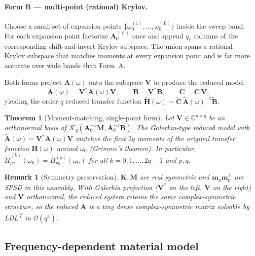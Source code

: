 \documentclass[11pt,a4paper]{article}
\newcommand{\C}{\mathbb{C}}
\newtheorem{theorem}{Theorem}
\newtheorem{remark}{Remark}
\begin{document}
\paragraph{Form B --- multi-point (rational) Krylov.}
Choose a small set of expansion points
$\{\omega_0^{(1)},\dots,\omega_0^{(L)}\}$ inside the sweep band. For each
expansion point factorize $\bm A_0^{(\ell)}$ once and append
$q_\ell$ columns of the corresponding shift-and-invert Krylov subspace.
The union spans a rational Krylov subspace that matches moments at every
expansion point and is far more accurate over wide bands than Form~A.

Both forms project $\bm A(\omega)$ onto the subspace $\bm V$ to produce
the reduced model
\begin{equation}
  \widetilde{\bm A}(\omega) = \bm V^{\!*}\bm A(\omega)\bm V,\qquad
  \widetilde{\bm B} = \bm V^{\!*}\bm B,\qquad
  \widetilde{\bm C} = \bm C\,\bm V,
\end{equation}
yielding the order-$q$ reduced transfer function
$\widetilde{\bm H}(\omega) = \widetilde{\bm C}\,\widetilde{\bm A}(\omega)^{-1}\widetilde{\bm B}$.

\begin{theorem}[Moment-matching, single-point form]
Let $\bm V\in\C^{n\times q}$ be an orthonormal basis of
$\mathcal{K}_q(\bm A_0^{-1}\bm M,\bm A_0^{-1}\bm B)$. The Galerkin-type
reduced model with $\widetilde{\bm A}(\omega) = \bm V^{\!*}\bm A(\omega)\bm V$
matches the first $2q$ moments of the original transfer function
$\bm H(\omega)$ around $\omega_0$ (Grimme's theorem). In particular,
\(
  \tilde H_{pq}^{(k)}(\omega_0) = H_{pq}^{(k)}(\omega_0)
\)
for all $k=0,1,\dots,2q-1$ and $p,q$.
\end{theorem}

\begin{remark}[Symmetry preservation]
$\bm K,\bm M$ are real symmetric and $\bm m_p\bm m_p^{\!\top}$ are SPSD
in this assembly. With Galerkin projection ($\bm V^{\!*}$ on the left,
$\bm V$ on the right) and $\bm V$ orthonormal, the reduced system retains
the same complex-symmetric structure, so the reduced $\widetilde{\bm A}$
is a tiny dense complex-symmetric matrix solvable by LDL\textsuperscript{T}
in $\mathcal{O}(q^3)$.
\end{remark}

\subsection{Frequency-dependent material model}\label{sec:dispersion}
\end{document}
